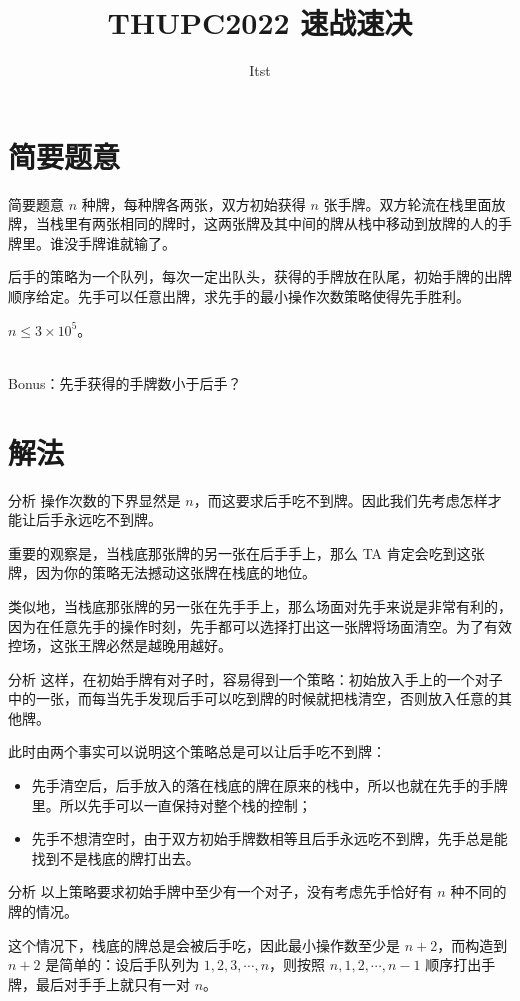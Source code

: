 \documentclass{beamer}
\title{THUPC2022 速战速决}
\author{Itst}
\institute{THU\ IIIS}
\begin{document}
\begin{frame}
\titlepage
\end{frame}
\section{简要题意}
\begin{frame}{简要题意}
	$n$ 种牌，每种牌各两张，双方初始获得 $n$ 张手牌。双方轮流在栈里面放牌，当栈里有两张相同的牌时，这两张牌及其中间的牌从栈中移动到放牌的人的手牌里。谁没手牌谁就输了。

	后手的策略为一个队列，每次一定出队头，获得的手牌放在队尾，初始手牌的出牌顺序给定。先手可以任意出牌，求先手的最小操作次数策略使得先手胜利。

	$n \le 3 \times 10^5$。

	~\\

	Bonus：先手获得的手牌数小于后手？
\end{frame}
\section{解法}
\begin{frame}{分析}
	操作次数的下界显然是 $n$，而这要求后手吃不到牌。因此我们先考虑怎样才能让后手永远吃不到牌。\pause

	重要的观察是，当栈底那张牌的另一张在后手手上，那么 TA 肯定会吃到这张牌，因为你的策略无法撼动这张牌在栈底的地位。\pause

	类似地，当栈底那张牌的另一张在先手手上，那么场面对先手来说是非常有利的，因为在任意先手的操作时刻，先手都可以选择打出这一张牌将场面清空。为了有效控场，这张王牌必然是越晚用越好。
\end{frame}
\begin{frame}{分析}
	这样，在初始手牌有对子时，容易得到一个策略：初始放入手上的一个对子中的一张，而每当先手发现后手可以吃到牌的时候就把栈清空，否则放入任意的其他牌。\pause

	此时由两个事实可以说明这个策略总是可以让后手吃不到牌：\begin{itemize}
		\item 先手清空后，后手放入的落在栈底的牌在原来的栈中，所以也就在先手的手牌里。所以先手可以一直保持对整个栈的控制；
		\item 先手不想清空时，由于双方初始手牌数相等且后手永远吃不到牌，先手总是能找到不是栈底的牌打出去。
	\end{itemize}
\end{frame}
\begin{frame}{分析}
	以上策略要求初始手牌中至少有一个对子，没有考虑先手恰好有 $n$ 种不同的牌的情况。
	
	这个情况下，栈底的牌总是会被后手吃，因此最小操作数至少是 $n+2$，而构造到 $n+2$ 是简单的：设后手队列为 $1,2,3,\cdots,n$，则按照 $n,1,2,\cdots,n-1$ 顺序打出手牌，最后对手手上就只有一对 $n$。
\end{frame}
\end{document}
